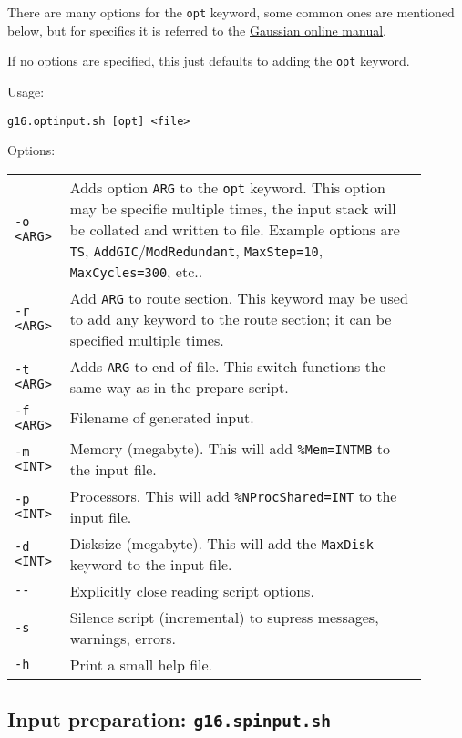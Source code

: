 \documentclass[   %
  final,          %
  a4paper         %
]{article}
\begin{document}
There are many options for the \texttt{opt} keyword, some common ones are mentioned below,
but for specifics it is referred to the \href{http://gaussian.com/opt/}{Gaussian online manual}.

If no options are specified, this just defaults to adding the \texttt{opt} keyword.

Usage: 

\lstinline`g16.optinput.sh [opt] <file>`

Options:

\begin{longtable}{p{0.1\linewidth}p{0.8\linewidth}}
  {\lstinline`-o <ARG>`} & Adds option {\lstinline`ARG`} to the \texttt{opt} keyword. 
    This option may be specifie multiple times, the input stack will be collated and written to file.
    Example options are \texttt{TS}, \texttt{AddGIC}/\texttt{ModRedundant}, \texttt{MaxStep=10}, \texttt{MaxCycles=300}, etc.. \\
  {\lstinline`-r <ARG>`} & Add {\lstinline`ARG`} to route section. 
    This keyword may be used to add any keyword to the route section; 
    it can be specified multiple times.\\
  {\lstinline`-t <ARG>`} & Adds {\lstinline`ARG`} to end of file. 
    This switch functions the same way as in the prepare script. \\
  {\lstinline`-f <ARG>`} & Filename of generated input. \\
  {\lstinline`-m <INT>`} & Memory (megabyte). This will add \texttt{\%Mem={\lstinline`INT`}MB} to the input file. \\
  {\lstinline`-p <INT>`} & Processors. This will add \texttt{\%NProcShared={\lstinline`INT`}} to the input file. \\
  {\lstinline`-d <INT>`} & Disksize (megabyte). This will add the \texttt{MaxDisk} keyword to the input file. \\
  {\lstinline`--`}       & Explicitly close reading script options. \\
  {\lstinline`-s`}       & Silence script (incremental) to supress messages, warnings, errors. \\
  {\lstinline`-h`}       & Print a small help file. \\
\end{longtable}

\subsection{Input preparation: \texorpdfstring{{\lstinline`g16.spinput.sh`}}{g16.spinput.sh}}
\label{sec:g16.spinput}
\end{document}
